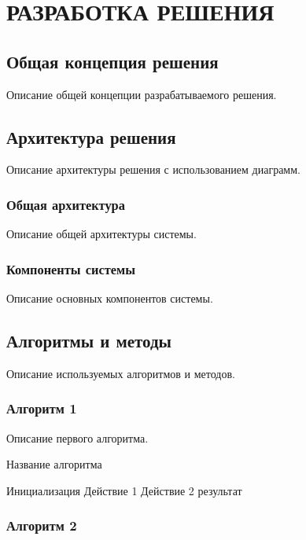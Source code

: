 \chapter{РАЗРАБОТКА РЕШЕНИЯ}

\section{Общая концепция решения}

Описание общей концепции разрабатываемого решения.

\section{Архитектура решения}

Описание архитектуры решения с использованием диаграмм.

\subsection{Общая архитектура}

Описание общей архитектуры системы.

\subsection{Компоненты системы}

Описание основных компонентов системы.

\section{Алгоритмы и методы}

Описание используемых алгоритмов и методов.

\subsection{Алгоритм 1}

Описание первого алгоритма.

\begin{algorithm}
\caption{Название алгоритма}
\begin{algorithmic}[1]
\STATE Инициализация
    \STATE Действие 1
    \STATE Действие 2
\ENDWHILE
\RETURN результат
\end{algorithmic}
\end{algorithm}

\subsection{Алгоритм 2}

